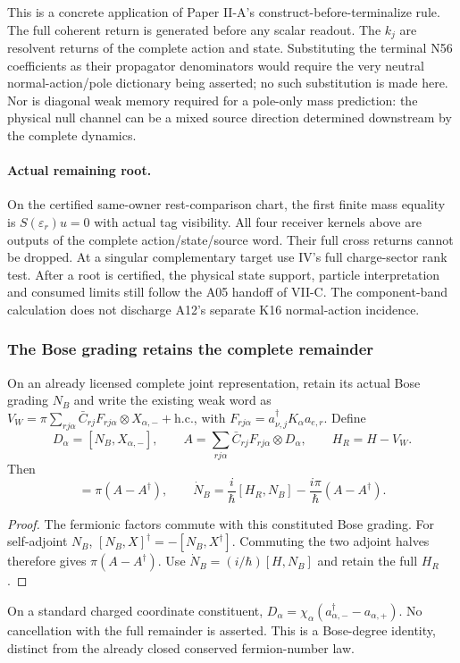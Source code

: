 \documentclass[12pt,a4paper]{article}
\begin{document}
This is a concrete application of Paper II-A's construct-before-terminalize
rule. The full coherent return is generated before any scalar readout.
The $k_j$ are resolvent returns of the complete action and state. Substituting
the terminal N56 coefficients as their propagator denominators would require
the very neutral normal-action/pole dictionary being asserted; no such
substitution is made here. Nor is diagonal weak memory required for a
pole-only mass prediction: the physical null channel can be a mixed source
direction determined downstream by the complete dynamics.


\paragraph{Actual remaining root.}
On the certified same-owner rest-comparison chart, the first finite mass
equality is $S(\varepsilon_r)u=0$ with actual tag visibility. All four receiver
kernels above are outputs of the complete action/state/source word.
Their full cross returns cannot be dropped. At a singular complementary
target use IV's full charge-sector rank test. After a root is certified,
the physical state support, particle interpretation and consumed limits
still follow the A05 handoff of VII-C. The component-band calculation
does not discharge A12's separate K16 normal-action incidence.


\subsubsection{The Bose grading retains the complete remainder}
\begin{lemma}
\label{p5c:lem:v2174-bosonic-grading-word}
On an already licensed complete joint representation, retain its actual
Bose grading $N_B$ and write the existing weak word as
$V_W=\pi\sum_{rj\alpha}\bar C_{rj}F_{rj\alpha}\otimes
X_{\alpha,-}+\mathrm{h.c.}$, with
$F_{rj\alpha}=a_{\nu,j}^\dagger K_\alpha a_{e,r}$.
Define
\[
 D_\alpha=[N_B,X_{\alpha,-}],\qquad
 A=\sum_{rj\alpha}\bar C_{rj}F_{rj\alpha}\otimes D_\alpha,
 \qquad H_R=H-V_W.
\]
Then
\begin{equation}
 [N_B,V_W]=\pi(A-A^\dagger),\qquad
 \dot N_B=\frac{i}{\hbar}[H_R,N_B]
                -\frac{i\pi}{\hbar}(A-A^\dagger).
 \label{p5c:eq:v2174-bosonic-grading-word}
\end{equation}
\end{lemma}
\begin{proof}
The fermionic factors commute with this constituted Bose grading.
For self-adjoint $N_B$, $[N_B,X]^\dagger=-[N_B,X^\dagger]$.
Commuting the two adjoint halves therefore gives $\pi(A-A^\dagger)$.
Use $\dot N_B=(i/\hbar)[H,N_B]$ and retain the full $H_R$.
\end{proof}
On a standard charged coordinate constituent,
$D_\alpha=\chi_\alpha(a_{\alpha,-}^\dagger-a_{\alpha,+})$.
No cancellation with the full remainder is asserted. This is a Bose-degree
identity, distinct from the already closed conserved fermion-number law.
\end{document}

